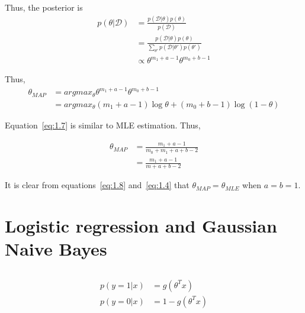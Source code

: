 \documentclass{article}
\begin{document}
Thus, the posterior is 
\begin{equation}
  \label{eq:1.6}
  \begin{split}
   p(\theta | \mathcal{D}) &= \frac{ p(\mathcal{D} | \theta) p(\theta)}{p(\mathcal{D})} \\
                           &= \frac{ p(\mathcal{D} | \theta) p(\theta)}{\sum_{\theta'}p(\mathcal{D} | \theta')p(\theta')} \\
                           &\propto \theta^{m_1 + a - 1} \theta^{m_0 + b - 1}
  \end{split}
\end{equation}

Thus, 
\begin{equation}
  \label{eq:1.7}
  \begin{split}
   \theta_{MAP} &= argmax_{\theta} \theta^{m_1 + a - 1} \theta^{m_0 + b - 1} \\
                &= argmax_{\theta} (m_1 + a -1 ) \log \theta + (m_0 + b -1) \log (1-\theta)
  \end{split}
\end{equation}


Equation~\ref{eq:1.7} is similar to MLE estimation. Thus,

\begin{equation}
  \label{eq:1.8}
  \begin{split}
    \theta_{MAP} &= \frac{m_1 + a - 1}{m_0 + m_1 + a + b -2} \\
                 &= \frac{m_1 + a - 1}{m + a + b -2}
  \end{split}
\end{equation}

It is clear from equations~\ref{eq:1.8} and~\ref{eq:1.4} that $\theta_{MAP} = \theta_{MLE}$ when $a=b=1$.

\section{Logistic regression and Gaussian Naive Bayes}
\subsection{}
\begin{equation}
  \label{eq:1.9}
  \begin{split}
    p(y=1 | x) &= g(\theta^T x) \\
    p(y=0 | x) &= 1 - g(\theta^T x) \\
  \end{split}
\end{equation}
\end{document}
